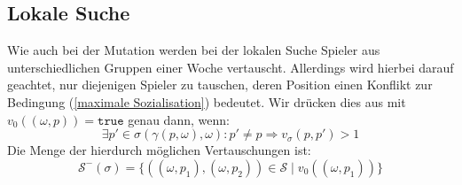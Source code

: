

\subsection{Lokale Suche}
Wie auch bei der Mutation werden bei der lokalen Suche Spieler aus unterschiedlichen Gruppen einer Woche vertauscht. 
Allerdings wird hierbei darauf geachtet, nur diejenigen Spieler zu tauschen, deren Position einen Konflikt zur  Bedingung (\ref{maximale Sozialisation}) bedeutet. 
Wir drücken dies aus mit $v_0((\omega, p)) = \texttt{true}$ genau dann, wenn:
\begin{equation}
  \exists p' \in \sigma(\gamma(p,\omega), \omega): p' \neq p \Rightarrow v_\sigma(p, p') > 1
\end{equation}
Die Menge der hierdurch möglichen Vertauschungen ist:
\begin{equation}
  \mathcal{S}^-(\sigma) = \{ ((\omega, p_1), (\omega, p_2)) \in \mathcal{S} \;|\; v_0((\omega, p_1)) \}
\end{equation}


